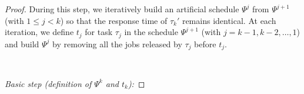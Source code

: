 \begin{proof}






During this step, we iteratively build an artificial schedule $\Psi^j$ from $\Psi^{j+1}$ (with $1 \leq j < k$) so that the response time of $\tau_{k}'$ remains identical. At each iteration, we define $t_j$ for task $\tau_j$ in the schedule $\Psi^{j+1}$ (with $j=k-1, k-2, \ldots, 1$) and build $\Psi^j$ by removing all the jobs released by $\tau_j$ before $t_j$.

~

\noindent\textit{Basic step (definition of $\Psi^k$ and $t_k$):} 


\end{proof}
